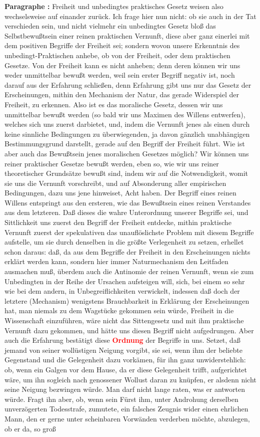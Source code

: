 \documentclass[a4paper,12pt,twoside]{book}
\newcommand{\match}[1]{\textcolor{red}{\textbf{#1}}}
\begin{document}
	\noindent\textbf{Paragraphe : }Freiheit und unbedingtes praktisches Gesetz weisen also wechselsweise auf einander zurück. Ich frage hier nun nicht: ob sie auch in der Tat verschieden sein, und nicht vielmehr ein unbedingtes Gesetz bloß das Selbstbewußtsein einer reinen praktischen Vernunft, diese aber ganz einerlei mit dem positiven Begriffe der Freiheit sei; sondern wovon unsere Erkenntnis des unbedingt-Praktischen anhebe, ob von der Freiheit, oder dem praktischen Gesetze. Von der Freiheit kann es nicht anheben; denn deren können wir uns weder unmittelbar bewußt werden, weil sein erster Begriff negativ ist, noch darauf aus der Erfahrung schließen, denn Erfahrung gibt uns nur das Gesetz der Erscheinungen, mithin den Mechanism der Natur, das gerade Widerspiel der Freiheit, zu erkennen. Also ist es das moralische Gesetz, dessen wir uns unmittelbar bewußt werden (so bald wir uns Maximen des Willens entwerfen), welches sich uns zuerst darbietet, und, indem die Vernunft jenes als einen durch keine sinnliche Bedingungen zu überwiegenden, ja davon gänzlich unabhängigen Bestimmungsgrund darstellt, gerade auf den Begriff der Freiheit führt. Wie ist aber auch das Bewußtsein jenes moralischen Gesetzes möglich? Wir können uns reiner praktischer Gesetze bewußt werden, eben so, wie wir uns reiner theoretischer Grundsätze bewußt sind, indem wir auf die Notwendigkeit, womit sie uns die Vernunft vorschreibt, und auf Absonderung aller empirischen Bedingungen, dazu uns jene hinweiset, Acht haben. Der Begriff eines reinen Willens entspringt aus den ersteren, wie das Bewußtsein eines reinen Verstandes aus dem letzteren. Daß dieses die wahre Unterordnung unserer Begriffe sei, und Sittlichkeit uns zuerst den Begriff der Freiheit entdecke, mithin praktische Vernunft zuerst der spekulativen das unauflöslichste Problem mit diesem Begriffe aufstelle, um sie durch denselben in die größte Verlegenheit zu setzen, erhellet schon daraus: daß, da aus dem Begriffe der  Freiheit in den Erscheinungen nichts erklärt werden kann, sondern hier immer Naturmechanism den Leitfaden ausmachen muß, überdem auch die Antinomie der reinen Vernunft, wenn sie zum Unbedingten in der Reihe der Ursachen aufsteigen will, sich, bei einem so sehr wie bei dem andern, in Unbegreiflichkeiten verwickelt, indessen daß doch der letztere (Mechanism) wenigstens Brauchbarkeit in Erklärung der Erscheinungen hat, man niemals zu dem Wagstücke gekommen sein würde, Freiheit in die Wissenschaft einzuführen, wäre nicht das Sittengesetz und mit ihm praktische Vernunft dazu gekommen, und hätte uns diesen Begriff nicht aufgedrungen. Aber auch die Erfahrung bestätigt diese \match{Ordnung} der Begriffe in uns. Setzet, daß jemand von seiner wollüstigen Neigung vorgibt, sie sei, wenn ihm der beliebte Gegenstand und die Gelegenheit dazu vorkämen, für ihn ganz unwiderstehlich: ob, wenn ein Galgen vor dem Hause, da er diese Gelegenheit trifft, aufgerichtet wäre, um ihn sogleich nach genossener Wollust daran zu knüpfen, er alsdenn nicht seine Neigung bezwingen würde. Man darf nicht lange raten, was er antworten würde. Fragt ihn aber, ob, wenn sein Fürst ihm, unter Androhung derselben unverzögerten Todesstrafe, zumutete, ein falsches Zeugnis wider einen ehrlichen Mann, den er gerne unter scheinbaren Vorwänden verderben möchte, abzulegen, ob er da, so groß 
\end{document}
